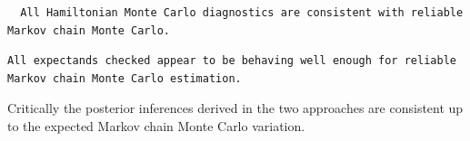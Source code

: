 \documentclass[
  letterpaper,
  DIV=11,
  numbers=noendperiod]{scrartcl}
\newenvironment{Shaded}{\begin{snugshade}}{\end{snugshade}}
\newcommand{\AttributeTok}[1]{\textcolor[rgb]{0.40,0.45,0.13}{#1}}
\newcommand{\DecValTok}[1]{\textcolor[rgb]{0.68,0.00,0.00}{#1}}
\newcommand{\FunctionTok}[1]{\textcolor[rgb]{0.28,0.35,0.67}{#1}}
\newcommand{\NormalTok}[1]{\textcolor[rgb]{0.00,0.23,0.31}{#1}}
\newcommand{\OtherTok}[1]{\textcolor[rgb]{0.00,0.23,0.31}{#1}}
\newcommand{\SpecialCharTok}[1]{\textcolor[rgb]{0.37,0.37,0.37}{#1}}
\newcommand{\StringTok}[1]{\textcolor[rgb]{0.13,0.47,0.30}{#1}}
\begin{document}
\begin{Shaded}
\end{Shaded}

\begin{verbatim}
  All Hamiltonian Monte Carlo diagnostics are consistent with reliable
Markov chain Monte Carlo.
\end{verbatim}

\begin{Shaded}
\end{Shaded}

\begin{verbatim}
All expectands checked appear to be behaving well enough for reliable
Markov chain Monte Carlo estimation.
\end{verbatim}

Critically the posterior inferences derived in the two approaches are
consistent up to the expected Markov chain Monte Carlo variation.
\end{document}
